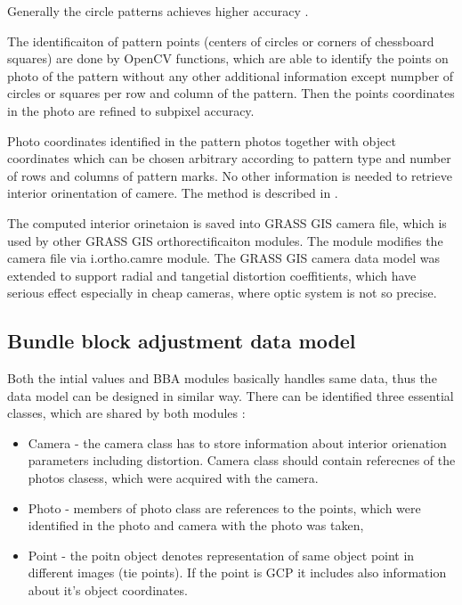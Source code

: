 \documentclass[a4paper,12pt]{report}
\begin{document}
Generally the circle patterns achieves higher accuracy \cite{camera_calibration2013opencv}.

The identificaiton of pattern points (centers of circles or corners of chessboard squares) 
are done by OpenCV functions, which are able to identify the points on photo of the pattern 
without any other additional information except numpber of circles or squares per row and column
of the pattern. Then the points coordinates in the photo are refined to subpixel accuracy.

Photo coordinates identified in the pattern photos together with object coordinates which can be chosen
arbitrary according to pattern type and number of rows and columns of pattern marks. 
No other information is needed to retrieve interior orinentation of camere. The method is described 
in \cite{zhang2000flexible}.

The computed interior orinetaion is saved into GRASS GIS camera file, which is used by other GRASS GIS 
orthorectificaiton modules. The module modifies the camera file via i.ortho.camre module.
The GRASS GIS camera data model was extended to support radial and tangetial distortion coeffitients, which 
have serious effect especially in cheap cameras, where optic system is not so precise.

\subsection{Bundle block adjustment data model}
 
Both the intial values and BBA modules basically handles  same data, thus 
the data model can be designed in similar way. There can be 
identified three essential classes, which are shared by both modules :
\begin{itemize}
\item Camera - the camera class has to store information about interior orienation 
parameters including distortion. Camera class should contain referecnes of the photos
clasess, which were acquired with the camera.
\item Photo - members of photo class are references to the points, which were identified 
	    in the photo and camera with the photo was taken,
\item Point - the poitn object denotes representation of same object point in different images (tie points).
 If the point is GCP it includes also information about it's object coordinates. 
\end{itemize}
\end{document}
